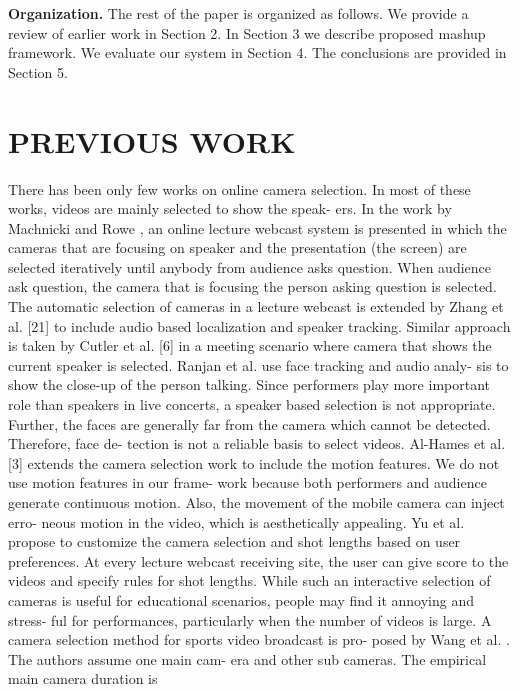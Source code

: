 \documentclass{sig-alternate}
\providecommand{\DIFadd}[1]{{\protect\color{blue}\uwave{#1}}} %
\providecommand{\DIFaddbegin}{} %
\providecommand{\DIFaddend}{} %
\begin{document}
\textbf{Organization.} The rest of the paper is organized as follows.
We provide a review of earlier work in Section 2. In Section 3 we
describe proposed mashup framework. We evaluate our system in
Section 4. The conclusions are provided in Section 5.


\section{PREVIOUS WORK}
\DIFaddbegin \DIFadd{I am a new sentence.
}\DIFaddend There has been only few works on online camera selection. In
most of these works, videos are mainly selected to show the speak-
ers. In the work by Machnicki and Rowe \cite{salas:nine}, an online lecture
webcast system is presented in which the cameras that are focusing
on speaker and the presentation (the screen) are selected iteratively
until anybody from audience asks question. When audience ask
question, the camera that is focusing the person asking question is
selected. The automatic selection of cameras in a lecture webcast
is extended by Zhang et al. [21] to include audio based localization
and speaker tracking. Similar approach is taken by Cutler et al. [6]
in a meeting scenario where camera that shows the current speaker
is selected. Ranjan et al. \cite{salas:twelve} use face tracking and audio analy-
sis to show the close-up of the person talking. Since performers
play more important role than speakers in live concerts, a speaker
based selection is not appropriate. Further, the faces are generally
far from the camera which cannot be detected. Therefore, face de-
tection is not a reliable basis to select videos.
Al-Hames et al. [3] extends the camera selection work to include
the motion features. We do not use motion features in our frame-
work because both performers and audience generate continuous
motion. Also, the movement of the mobile camera can inject erro-
neous motion in the video, which is aesthetically appealing. Yu et
al. \cite{salas:twenty} propose to customize the camera selection and shot lengths
based on user preferences. At every lecture webcast receiving site,
the user can give score to the videos and specify rules for shot
lengths. While such an interactive selection of cameras is useful
for educational scenarios, people may find it annoying and stress-
ful for performances, particularly when the number of videos is
large.
A camera selection method for sports video broadcast is pro-
posed by Wang et al. \cite{salas:sixteen}. The authors assume one main cam-
era and other sub cameras. The empirical main camera duration is
\end{document}
